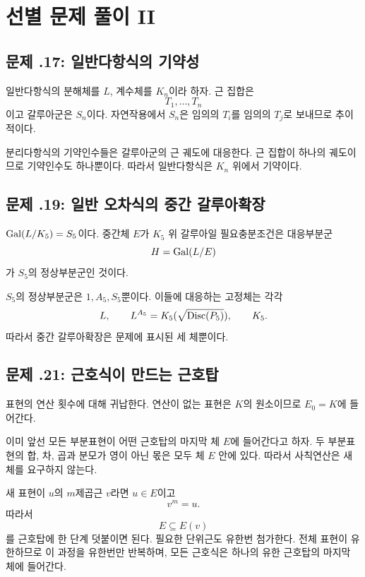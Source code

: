 \clearpage
\section{선별 문제 풀이 II}
\label{sec:abel-ruffini-solutions-b}

\subsection*{문제 \thechapter.17: 일반다항식의 기약성}

\begin{solution}
일반다항식의 분해체를 $L$, 계수체를 $K_n$이라 하자. 근 집합은
\[
  T_1,\dots,T_n
\]
이고 갈루아군은 $S_n$이다. 자연작용에서 $S_n$은 임의의 $T_i$를 임의의 $T_j$로 보내므로 추이적이다.

분리다항식의 기약인수들은 갈루아군의 근 궤도에 대응한다. 근 집합이 하나의 궤도이므로 기약인수도 하나뿐이다. 따라서 일반다항식은 $K_n$ 위에서 기약이다.
\end{solution}

\subsection*{문제 \thechapter.19: 일반 오차식의 중간 갈루아확장}

\begin{solution}
$\operatorname{Gal}(L/K_5)=S_5$이다. 중간체 $E$가 $K_5$ 위 갈루아일 필요충분조건은 대응부분군
\[
  H=\operatorname{Gal}(L/E)
\]
가 $S_5$의 정상부분군인 것이다.

$S_5$의 정상부분군은 $1,A_5,S_5$뿐이다. 이들에 대응하는 고정체는 각각
\[
  L,
  \qquad
  L^{A_5}=K_5(\sqrt{\operatorname{Disc}(P_5)}),
  \qquad
  K_5.
\]
따라서 중간 갈루아확장은 문제에 표시된 세 체뿐이다.
\end{solution}

\subsection*{문제 \thechapter.21: 근호식이 만드는 근호탑}

\begin{solution}
표현의 연산 횟수에 대해 귀납한다. 연산이 없는 표현은 $K$의 원소이므로 $E_0=K$에 들어간다.

이미 앞선 모든 부분표현이 어떤 근호탑의 마지막 체 $E$에 들어간다고 하자. 두 부분표현의 합, 차, 곱과 분모가 영이 아닌 몫은 모두 체 $E$ 안에 있다. 따라서 사칙연산은 새 체를 요구하지 않는다.

새 표현이 $u$의 $m$제곱근 $v$라면 $u\in E$이고
\[
  v^m=u.
\]
따라서
\[
  E\subseteq E(v)
\]
를 근호탑에 한 단계 덧붙이면 된다. 필요한 단위근도 유한번 첨가한다. 전체 표현이 유한하므로 이 과정을 유한번만 반복하며, 모든 근호식은 하나의 유한 근호탑의 마지막 체에 들어간다.
\end{solution}

